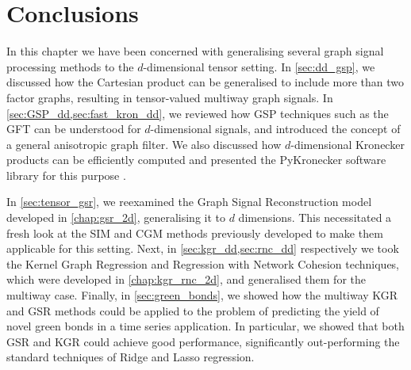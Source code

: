 \section{Conclusions}

In this chapter we have been concerned with generalising several graph signal processing methods to the $d$-dimensional tensor setting. In \cref{sec:dd_gsp}, we discussed how the Cartesian product can be generalised to include more than two factor graphs, resulting in tensor-valued multiway graph signals. In \cref{sec:GSP_dd,sec:fast_kron_dd}, we reviewed how GSP techniques such as the GFT can be understood for $d$-dimensional signals, and introduced the concept of a general anisotropic graph filter. We also discussed how $d$-dimensional Kronecker products can be efficiently computed and presented the PyKronecker software library for this purpose \citep{Antonian2023}.

In \cref{sec:tensor_gsr}, we reexamined the Graph Signal Reconstruction model developed in \cref{chap:gsr_2d}, generalising it to $d$ dimensions. This necessitated a fresh look at the SIM and CGM methods previously developed to make them applicable for this setting. Next, in \cref{sec:kgr_dd,sec:rnc_dd} respectively we took the Kernel Graph Regression and Regression with Network Cohesion techniques, which were developed in \cref{chap:kgr_rnc_2d}, and generalised them for the multiway case. Finally, in \cref{sec:green_bonds}, we showed how the multiway KGR and GSR methods could be applied to the problem of predicting the yield of novel green bonds in a time series application. In particular, we showed that both GSR and KGR could achieve good performance, significantly out-performing the standard techniques of Ridge and Lasso regression. 

